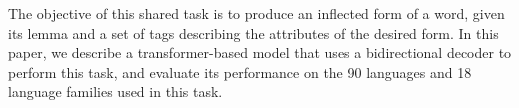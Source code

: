 The objective of this shared task is to produce an inflected form of a word, given its lemma and a set of tags describing the attributes of the desired form. In this paper, we describe a transformer-based model that uses a bidirectional decoder to perform this task, and evaluate its performance on the 90 languages and 18 language families used in this task.

